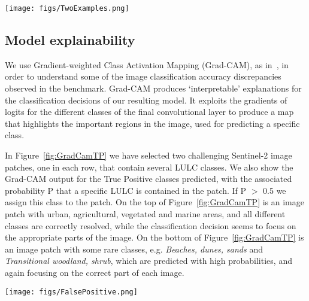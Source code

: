 \documentclass[journal]{IEEEtran}
\begin{document}
 \begin{figure*}[!ht]
 \texttt{[image: figs/TwoExamples.png]}
 \centering
\caption{Examples of two challenging image patches, correctly classified. The first patch in Examples A \& B is the original Sentinel-2 image patch with the different LULC classes contained. The other patches are the output of Grad-CAM~\citep{Selvaraju_2017_ICCV} that we adopt to interpret which parts of the image were used by our network for deciding on each specific True Positive LULC class. P stands for the probability a specific LULC is contained in the patch.}
\label{fig:GradCamTP}
\end{figure*}

\subsection{Model explainability}
We use Gradient-weighted Class Activation Mapping (Grad-CAM), as in~\cite{Selvaraju_2017_ICCV}, in order to understand some of the image classification accuracy discrepancies observed in the benchmark. Grad-CAM produces `interpretable' explanations for the classification decisions of our resulting model. It exploits the gradients of logits for the different classes of the final convolutional layer to produce a map that  highlights the important regions in the image, used for predicting a specific class. 



In Figure~\ref{fig:GradCamTP} we have selected two challenging Sentinel-2 image patches, one in each row, that contain several LULC classes. We also show the Grad-CAM output for the True Positive classes predicted, with the associated probability P that a specific LULC is contained in the patch. If P $>$ 0.5 we assign this class to the patch. On the top of Figure~\ref{fig:GradCamTP} is an image patch with urban, agricultural, vegetated and marine areas, and all different classes are correctly resolved, while the classification decision seems to focus on the appropriate parts of the image. On the bottom of Figure~\ref{fig:GradCamTP} is an image patch with some rare classes, e.g. \textit{Beaches, dunes, sands} and \textit{Transitional woodland, shrub}, which are predicted with high probabilities, and again focusing on the correct part of each image.

 \begin{figure*}[h]
 \texttt{[image: figs/FalsePositive.png]}
\caption{Examples of image pairs with False Positive LULC {\color{blue} scene} classification. For each pair we show on the left the original Sentinel-2 image patch with all the LULC classes contained, and we show on the right the Grad-CAM~\citep{Selvaraju_2017_ICCV} output for a False Positive class. Red areas correspond to the part of the image patch used to make the False Positive prediction. P stands for the probability a specific LULC is contained in the patch.  }
\label{fig:GradCamFP}
\end{figure*}
\end{document}
